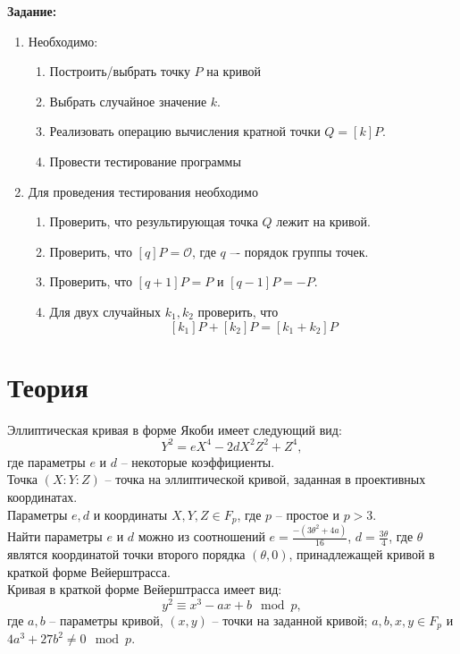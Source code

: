 \documentclass[a4paper,12pt]{article}
\begin{document}
	\textbf{Задание:}\\
	\begin{enumerate}
		\item Необходимо:
		\begin{enumerate}
			\item Построить/выбрать точку $P$ на кривой
			\item Выбрать случайное значение $k$.
			\item Реализовать операцию вычисления кратной точки $Q=[k]P$.
			\item Провести тестирование программы
		\end{enumerate}
		\item Для проведения тестирования необходимо
		\begin{enumerate}
			\item Проверить, что результирующая точка $Q$ лежит на кривой.
			\item Проверить, что $[q]P=\mathcal{O}$, где $q$ –- порядок группы точек.
			\item Проверить, что $[q+1]P=P$ и $[q-1]P=-P$.
			\item Для двух случайных $k_1, k_2$ проверить, что \[[k_1]P+[k_2]P=[k_1+k_2]P\]
		\end{enumerate}
	\end{enumerate}
	
	
	\newpage
	
	\section{Теория}
	Эллиптическая кривая в форме Якоби имеет следующий вид: \[  Y^2=eX^4-2dX^2Z^2+Z^4,\]
	где параметры $e$ и $d$ -- некоторые коэффициенты.\\
	Точка $(X : Y : Z)$ -- точка на эллиптической кривой, заданная в проективных координатах. \\
	Параметры $e, d$ и координаты $X, Y, Z \in F_p$, где $p$ -- простое и $p>3$.\\
	Найти параметры $e$ и $d$ можно из соотношений $e=\frac{-(3\theta^2+4a)}{16}$, $d=\frac{3\theta}{4}$, где $\theta$ являтся координатой точки второго порядка $(\theta, 0)$, принадлежащей кривой в краткой форме Вейерштрасса.\\
	
	Кривая в краткой форме Вейерштрасса имеет вид:
	\begin{equation}\label{eq:short_wei}
		y^2\equiv x^3-ax+b \mod p,
	\end{equation}
	где $a, b$ -- параметры кривой, $(x, y)$ -- точки на заданной кривой; $a, b, x, y \in F_p$ и $4a^3+27b^2\neq 0 \mod p$.\\
	
\end{document}
